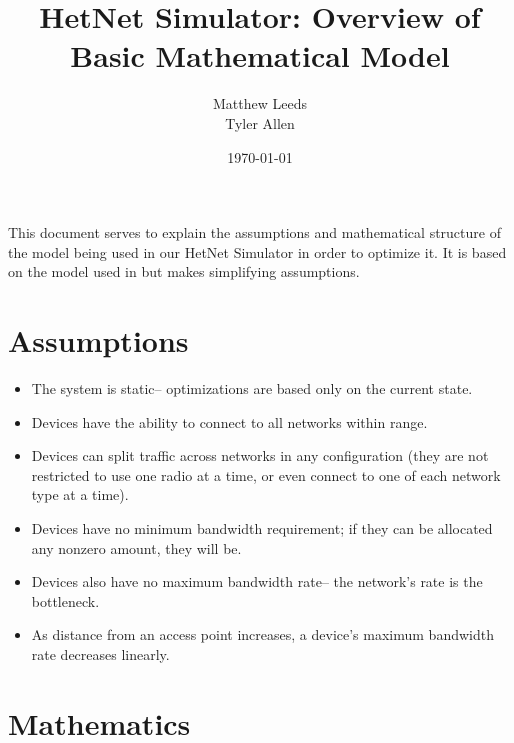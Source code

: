 \documentclass[11pt]{article}
\title{HetNet Simulator: Overview of Basic Mathematical Model}
\author{Matthew Leeds\\
		Tyler Allen\\}
\date{\today}
\begin{document}
\maketitle
This document serves to explain the assumptions and mathematical structure of the model being used in our HetNet Simulator in order to optimize it. It is based on the model used in \cite{amin13} but makes simplifying assumptions.

\section{Assumptions}

\begin{itemize}
\item The system is static-- optimizations are based only on the current state.
\item Devices have the ability to connect to all networks within range.
\item Devices can split traffic across networks in any configuration (they are not restricted to use one radio at a time, or even connect to one of each network type at a time).
\item Devices have no minimum bandwidth requirement; if they can be allocated any nonzero amount, they will be.
\item Devices also have no maximum bandwidth rate-- the network's rate is the bottleneck.
\item As distance from an access point increases, a device's maximum bandwidth rate decreases linearly.
\end{itemize}

\section{Mathematics}
\end{document}
